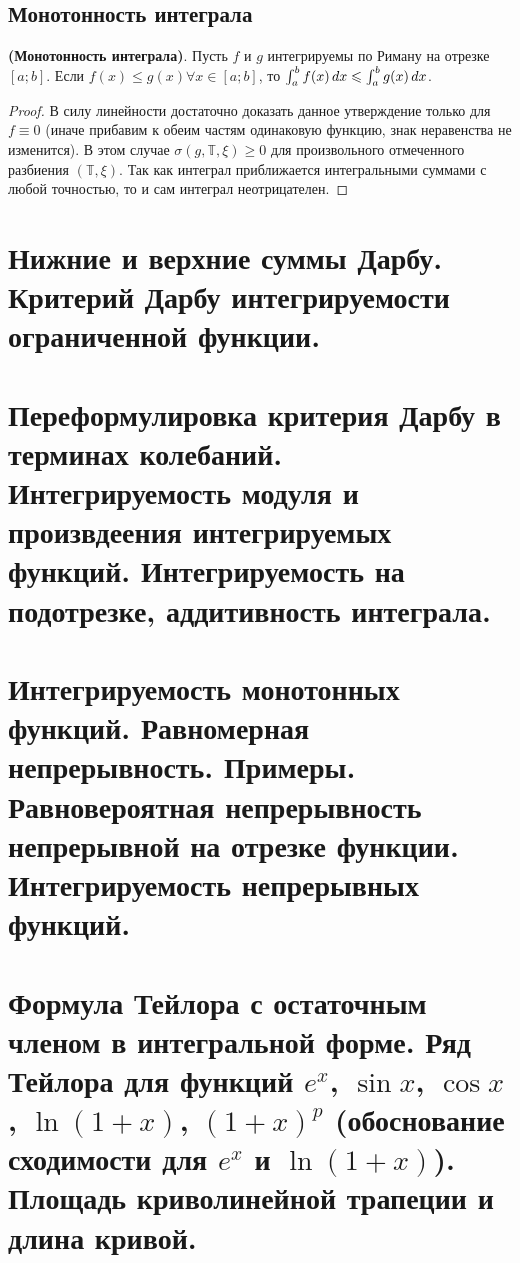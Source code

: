 \documentclass[a4paper]{article}
\theoremstyle{named}
\newcommand{\T}{\mathbb{T}}
\renewcommand{\int}{\intop}
\begin{document}
        \subsection{Монотонность интеграла} 

        \begin{proposal*}
            \textbf{(Монотонность интеграла)}. Пусть $f$ и $g$ интегрируемы по Риману на отрезке $[a; b]$. Если $f(x) \leq g(x) \forall x \in [a; b]$, то $\int_a^b f(x) \dd x \leq \int_a^b g(x) \dd x$.
        \end{proposal*}

        \begin{proof}
            В силу линейности достаточно доказать данное утверждение только для $f \equiv 0$ (иначе прибавим к обеим частям одинаковую функцию, знак неравенства не изменится). В этом случае $\sigma(g, \T, \xi) \geq 0$ для произвольного отмеченного разбиения $(\T, \xi)$. Так как интеграл приближается интегральными суммами с любой точностью, то и сам интеграл неотрицателен.
        \end{proof}

    \section{Нижние и верхние суммы Дарбу. Критерий Дарбу интегрируемости ограниченной функции.}

    \section{Переформулировка критерия Дарбу в терминах колебаний. Интегрируемость модуля и произвдеения интегрируемых функций. Интегрируемость на подотрезке, аддитивность интеграла.}

    \section{Интегрируемость монотонных функций. Равномерная непрерывность. Примеры. Равновероятная непрерывность непрерывной на отрезке функции. Интегрируемость непрерывных функций.}

    \section{Формула Тейлора с остаточным членом в интегральной форме. Ряд Тейлора для функций $e^x$, $\sin x$, $\cos x$, $\ln(1 + x)$, $(1 + x)^p$ (обоснование сходимости для $e^x$ и $\ln(1 + x)$). Площадь криволинейной трапеции и длина кривой.}
\end{document}
